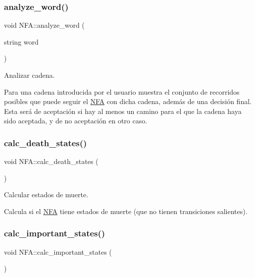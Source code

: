 \subsubsection{\texorpdfstring{analyze\+\_\+word()}{analyze\_word()}}
{\footnotesize\ttfamily void N\+F\+A\+::analyze\+\_\+word (\begin{DoxyParamCaption}\item[{string}]{word }\end{DoxyParamCaption})}



Analizar cadena. 

Para una cadena introducida por el usuario muestra el conjunto de recorridos posibles que puede seguir el \mbox{\hyperlink{class_n_f_a}{N\+FA}} con dicha cadena, además de una decisión final. Esta será de aceptación si hay al menos un camino para el que la cadena haya sido aceptada, y de no aceptación en otro caso. \mbox{\label{class_n_f_a_a6a32ddeb3c446ff0f31f09f3d04b1582}} 
\subsubsection{\texorpdfstring{calc\+\_\+death\+\_\+states()}{calc\_death\_states()}}
{\footnotesize\ttfamily void N\+F\+A\+::calc\+\_\+death\+\_\+states (\begin{DoxyParamCaption}{ }\end{DoxyParamCaption})}



Calcular estados de muerte. 

Calcula si el \mbox{\hyperlink{class_n_f_a}{N\+FA}} tiene estados de muerte (que no tienen transiciones salientes). \mbox{\label{class_n_f_a_addc2cae46439f77116f37230ec8a90d0}} 
\subsubsection{\texorpdfstring{calc\+\_\+important\+\_\+states()}{calc\_important\_states()}}
{\footnotesize\ttfamily void N\+F\+A\+::calc\+\_\+important\+\_\+states (\begin{DoxyParamCaption}{ }\end{DoxyParamCaption})}



